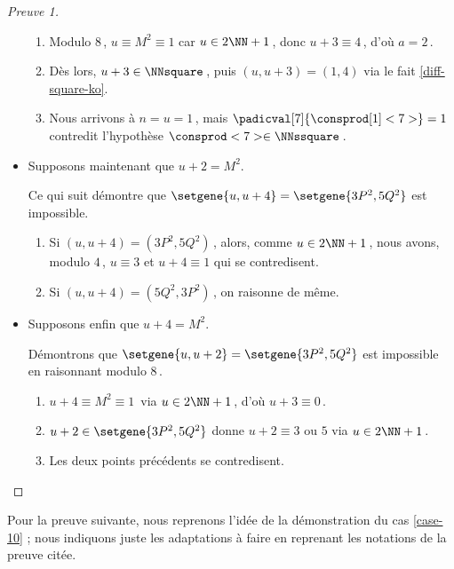 \begin{proof}[Preuve 1]
\begin{itemize}
\begin{enumerate}
			\item Modulo $8$\,, $u \equiv M^2 \equiv 1$ car $u \in 2 \NN + 1$\,,
			donc $u + 3 \equiv 4$\,, d'où $a = 2$\,.

			\item Dès lors, $u + 3 \in \NNsquare$\,, puis $(u, u + 3) = (1, 4)$ via le fait \ref{diff-square-ko}.

			\item Nous arrivons à $n = u = 1$\,, mais $\padicval[7]{\consprod[1]<7>} = 1$ contredit l'hypothèse $\consprod<7> \in \NNssquare$\,.
		\end{enumerate}


    	\item Supposons maintenant que $u + 2 = M^2$.

		\smallskip
		\noindent
		Ce qui suit démontre que $\setgene{u, u + 4} = \setgene{3P^2, 5Q^2}$ est impossible.
		\begin{enumerate}
			\item Si $(u, u + 4) = (3P^2, 5Q^2)$\,, alors,
			comme $u \in 2 \NN + 1$\,, nous avons, modulo $4$\,,
			$u \equiv 3$
			et
			$u+4 \equiv 1$
			qui se contredisent.

			\item Si $(u, u + 4) = (5Q^2, 3P^2)$\,, on raisonne de même.
		\end{enumerate}


    	\item Supposons enfin que $u + 4 = M^2$.

		\smallskip
		\noindent
		Démontrons que $\setgene{u, u + 2} = \setgene{3P^2, 5Q^2}$ est impossible en raisonnant modulo $8$\,.
		\begin{enumerate}
			\item $u + 4 \equiv M^2 \equiv 1$\, via $u \in 2 \NN + 1$\,,
			d'où $u + 3 \equiv 0$\,.

			\item $u + 2 \in \setgene{3P^2, 5Q^2}$ donne $u + 2 \equiv \text{$3$ ou $5$}$  via $u \in 2 \NN + 1$\,.

			\item Les deux points précédents se contredisent. \qedhere
		\end{enumerate}
    \end{itemize}
\end{proof}




Pour la preuve suivante, nous reprenons l'idée de la démonstration du cas \ref{case-10} ; nous indiquons juste les adaptations à faire en reprenant les notations de la preuve citée.


